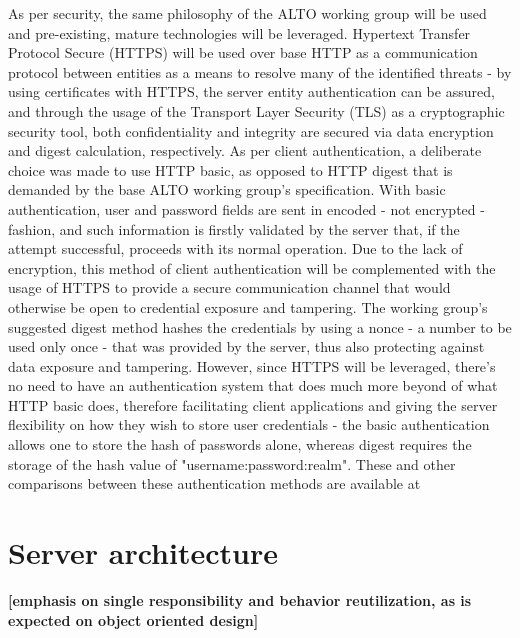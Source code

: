     As per security, the same philosophy of the ALTO working group will be used and pre-existing, mature technologies will be leveraged.
    Hypertext Transfer Protocol Secure (HTTPS) will be used over base HTTP as a communication protocol between entities as a means to resolve many of the identified threats - by using certificates with HTTPS, the server entity authentication can be assured, and through the usage of the Transport Layer Security (TLS) as a cryptographic security tool, both confidentiality and integrity are secured via data encryption and digest calculation, respectively.
    As per client authentication, a deliberate choice was made to use HTTP basic, as opposed to HTTP digest that is demanded by the base ALTO working group's specification.
    With basic authentication, user and password fields are sent in encoded - not encrypted - fashion, and such information is firstly validated by the server that, if the attempt successful, proceeds with its normal operation.
    Due to the lack of encryption, this method of client authentication will be complemented with the usage of HTTPS to provide a secure communication channel that would otherwise be open to credential exposure and tampering.
    The working group's suggested digest method hashes the credentials by using a nonce - a number to be used only once - that was provided by the server, thus also protecting against data exposure and tampering.
    However, since HTTPS will be leveraged, there's no need to have an authentication system that does much more beyond of what HTTP basic does, therefore facilitating client applications and giving the server flexibility on how they wish to store user credentials - the basic authentication allows one to store the hash of passwords alone, whereas digest requires the storage of the hash value of "username:password:realm".
    These and other comparisons between these authentication methods are available at \cite{https://sci-hub.se/https://link.springer.com/chapter/10.1007/978-1-4302-6817-8_3}


\section{Server architecture}


    \textbf{[emphasis on single responsibility and behavior reutilization, as is expected on object oriented design]}

